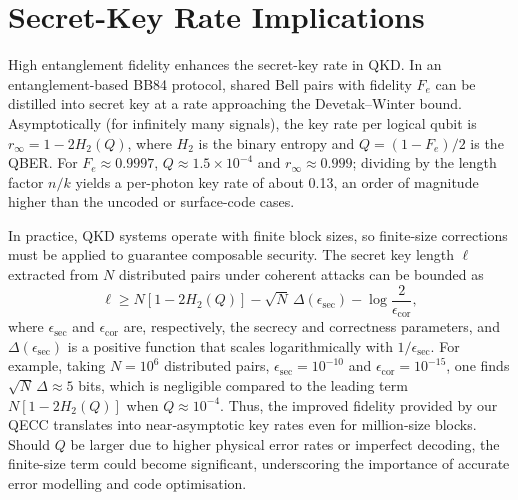 \documentclass[conference]{IEEEtran}  %
\begin{document}
\section{Secret-Key Rate Implications}\label{sec:finitekey}
High entanglement fidelity enhances the secret-key rate in QKD.  In an entanglement-based BB84 protocol, shared Bell pairs with fidelity $F_e$ can be distilled into secret key at a rate approaching the Devetak–Winter bound\cite{Devetak2005,Pirandola2020}.  Asymptotically (for infinitely many signals), the key rate per logical qubit is $r_\infty = 1 - 2 H_2(Q)$, where $H_2$ is the binary entropy and $Q=(1-F_e)/2$ is the QBER.  For $F_e \approx 0.9997$, $Q \approx 1.5\times 10^{-4}$ and $r_\infty \approx 0.999$; dividing by the length factor $n/k$ yields a per-photon key rate of about 0.13, an order of magnitude higher than the uncoded or surface-code cases.

In practice, QKD systems operate with finite block sizes, so finite-size corrections must be applied to guarantee composable security.  The secret key length $\ell$ extracted from $N$ distributed pairs under coherent attacks can be bounded as\cite{Pirandola2020}
\begin{equation}
    \ell \geq N \left[1 - 2 H_2(Q)\right] - \sqrt{N}\,\Delta(\epsilon_{\text{sec}}) - \log\frac{2}{\epsilon_{\text{cor}}},
\end{equation}
where $\epsilon_{\text{sec}}$ and $\epsilon_{\text{cor}}$ are, respectively, the secrecy and correctness parameters, and $\Delta(\epsilon_{\text{sec}})$ is a positive function that scales logarithmically with $1/\epsilon_{\text{sec}}$.  For example, taking $N=10^6$ distributed pairs, $\epsilon_{\text{sec}}=10^{-10}$ and $\epsilon_{\text{cor}}=10^{-15}$, one finds $\sqrt{N}\,\Delta \approx 5$ bits, which is negligible compared to the leading term $N [1 - 2 H_2(Q)]$ when $Q\approx 10^{-4}$.  Thus, the improved fidelity provided by our QECC translates into near‑asymptotic key rates even for million‑size blocks.  Should $Q$ be larger due to higher physical error rates or imperfect decoding, the finite-size term could become significant, underscoring the importance of accurate error modelling and code optimisation.
\end{document}
